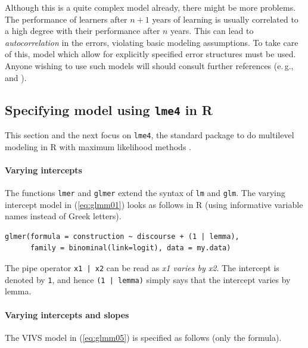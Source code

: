 \documentclass[a4paper,12pt]{article}
\newcommand{\eg}{e.\,g.,\ }
\begin{document}
Although this is a quite complex model already, there might be more problems.
The performance of learners after $n+1$ years of learning is usually correlated to a high degree with their performance after $n$ years.
This can lead to \textit{autocorrelation} in the errors, violating basic modeling assumptions.
To take care of this, model which allow for explicitly specified error structures must be used.
Anyone wishing to use such models will should consult further references (\eg \citealt{Fox2016} and \citealt{ZuurEa2009}).

\subsection{Specifying model using \texttt{lme4} in R}
\label{sec:specifyingmodelsusinglme4inr}

This section and the next focus on \texttt{lme4}, the standard package to do multilevel modeling in R with maximum likelihood methods \citep{BatesEa2015}.
\paragraph{Varying intercepts}

The functions \texttt{lmer} and \texttt{glmer} extend the syntax of \texttt{lm} and \texttt{glm}.
The varying intercept model in (\ref{eq:glmm01}) looks as follows in R (using informative variable names instead of Greek letters).

\vspace{0.5\baselineskip}

\begin{lstlisting}
glmer(formula = construction ~ discourse + (1 | lemma),
      family = binominal(link=logit), data = my.data)
\end{lstlisting}

The pipe operator \texttt{x1 | x2} can be read as \textit{x1 varies by x2}.
The intercept is denoted by \texttt{1}, and hence \texttt{(1 | lemma)} simply says that the intercept varies by lemma.

\paragraph{Varying intercepts and slopes}

The VIVS model in (\ref{eq:glmm05}) is specified as follows (only the formula).

\vspace{0.5\baselineskip}
\end{document}
